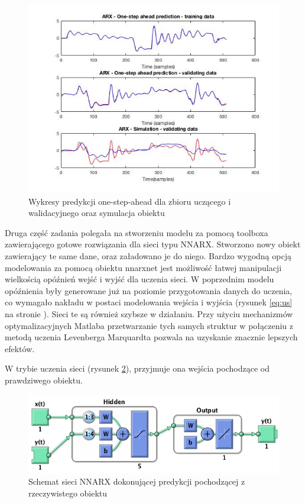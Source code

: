 \documentclass{article}
\begin{document}
\begin{figure}
\centering
	\includegraphics[width=\textwidth]{25}
\caption{Wykresy predykcji one-step-ahead dla zbioru uczącego i walidacyjnego oraz symulacja obiektu}
		\label{fig:25}
\end{figure}

Druga część zadania polegała na stworzeniu modelu za pomocą toolboxa zawierającego
gotowe rozwiązania dla sieci typu NNARX.
Stworzono nowy obiekt zawierający te same dane, oraz załadowano je do niego.
Bardzo wygodną opcją modelowania za pomocą obiektu nnarxnet jest możliwość łatwej
manipulacji wielkością opóźnień wejść i wyjść dla uczenia sieci. W poprzednim
modelu opóźnienia były generowane już na poziomie przygotowania danych do uczenia,
co wymagało nakładu w postaci modelowania wejścia i wyjścia (rysunek \ref{eq:us} na stronie \pageref{eq:us}).
Sieci te są również szybsze w działaniu.
Przy użyciu mechanizmów optymalizacyjnych Matlaba przetwarzanie tych samych
struktur w połączeniu z metodą uczenia Levenberga Marquardta pozwala na uzyskanie
znacznie lepszych efektów.

\newpage
W trybie uczenia sieci (rysunek \ref{fig:open}), przyjmuje ona wejścia pochodzące od prawdziwego obiektu.
\begin{figure}[H]
\centering
	\includegraphics[width=\textwidth]{open.png}
\caption{Schemat sieci NNARX dokonującej predykcji pochodzącej z rzeczywistego obiektu}
		\label{fig:open}
\end{figure}
\end{document}
